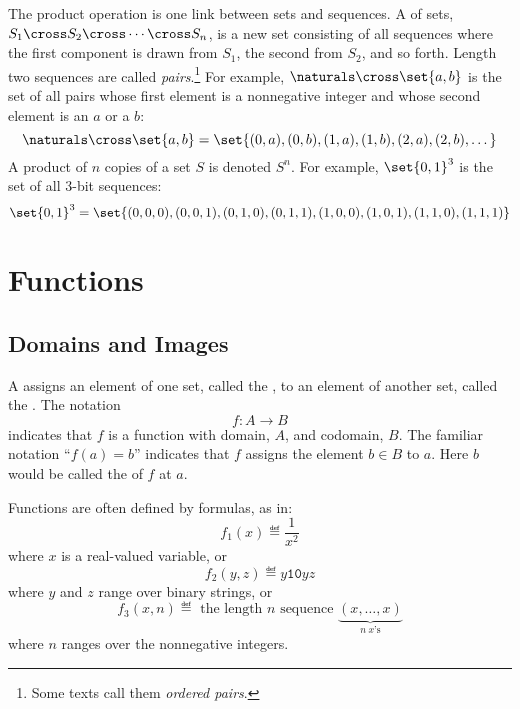 The product operation is one link between sets and sequences.  A
 of sets, $S_1 \cross S_2 \cross \cdots \cross
S_n$, is a new set consisting of all sequences where the first
component is drawn from $S_1$, the second from $S_2$, and so forth.
Length two sequences are called \emph{pairs}.\footnote{Some texts call
  them \emph{ordered pairs}.}  For example, $\naturals \cross
\set{a,b}$ is the set of all pairs whose first element is a
nonnegative integer and whose second element is an $a$ or a $b$:
\[
\naturals \cross \set{a,b}
    = \set{(0,a), (0,b), (1,a), (1,b), (2,a), (2, b), \dots}
\]
A product of $n$ copies of a set $S$ is denoted $S^n$.  For example,
$\set{0, 1}^3$ is the set of all $3$-bit sequences:
\[
\set{0, 1}^3 = \set{ (0,0,0), (0,0,1), (0,1,0), (0,1,1),
                     (1,0,0), (1,0,1), (1,1,0), (1,1,1) }
\]

\begin{problems}

\homeworkproblems
{}
\end{problems}


\section{Functions}\label{funcsubsec}


\subsection{Domains and Images}

A  assigns an element of one set, called the
, to an element of another set, called the
.  The notation
\[
f: A \to B
\]
indicates that $f$ is a function with domain, $A$, and codomain, $B$.  The
familiar notation ``$f(a) = b$'' indicates that $f$ assigns the element $b
\in B$ to $a$.  Here $b$ would be called the  of $f$ at
 $a$.

Functions are often defined by formulas, as in:
\[
f_1(x) \eqdef \frac{1}{x^2}
\]
where $x$ is a real-valued variable, or
\[
f_2(y,z) \eqdef y\mathtt{10}yz
\]
where $y$ and $z$ range over binary strings, or
\[
f_3(x, n) \eqdef \text{ the length $n$ sequence } \underbrace{(x, \dots, x)}_{n\ x\text{'s}}
\]
where $n$ ranges over the nonnegative integers.

